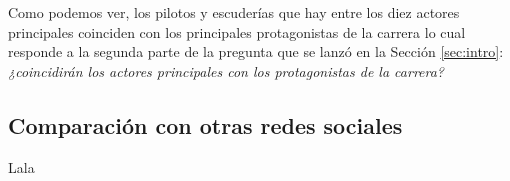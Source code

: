 Como podemos ver, los pilotos y escuderías que hay entre los diez actores principales coinciden con los principales protagonistas de la carrera lo cual responde a la segunda parte de la pregunta que se lanzó en la Sección \ref{sec:intro}: \textit{¿coincidirán los actores principales con los protagonistas de la carrera?}

\subsection{Comparación con otras redes sociales}

Lala


\newpage


